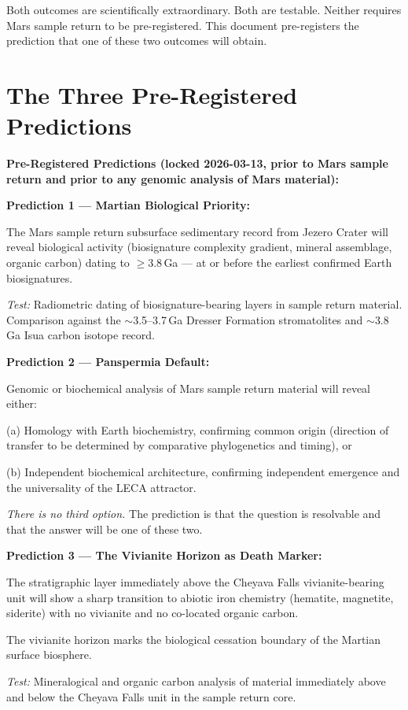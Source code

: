 \documentclass[11pt, a4paper]{article}
\begin{document}
Both outcomes are scientifically
extraordinary.
Both are testable.
Neither requires Mars sample return
to be pre-registered.
This document pre-registers the
prediction that one of these two
outcomes will obtain.

\section{The Three Pre-Registered Predictions}

\begin{mdframed}[
  linecolor=rulecolor,
  linewidth=0.8pt,
  innertopmargin=0.6em,
  innerbottommargin=0.6em,
  innerleftmargin=1em,
  innerrightmargin=1em
]
\textbf{Pre-Registered Predictions
(locked 2026-03-13, prior to Mars
sample return and prior to any
genomic analysis of Mars material):}

\medskip
\textbf{Prediction 1 --- Martian Biological Priority:}

The Mars sample return subsurface
sedimentary record from Jezero Crater
will reveal biological activity
(biosignature complexity gradient,
mineral assemblage, organic carbon)
dating to $\geq$3.8\,Ga ---
at or before the earliest confirmed
Earth biosignatures.

\textit{Test:} Radiometric dating of
biosignature-bearing layers in
sample return material.
Comparison against the $\sim$3.5--3.7\,Ga
Dresser Formation stromatolites and
$\sim$3.8\,Ga Isua carbon isotope record.

\medskip
\textbf{Prediction 2 --- Panspermia Default:}

Genomic or biochemical analysis of Mars
sample return material will reveal either:

(a) Homology with Earth biochemistry,
confirming common origin (direction of
transfer to be determined by comparative
phylogenetics and timing), or

(b) Independent biochemical architecture,
confirming independent emergence and
the universality of the LECA attractor.

\textit{There is no third option.}
The prediction is that the question is
resolvable and that the answer will
be one of these two.

\medskip
\textbf{Prediction 3 --- The Vivianite Horizon
as Death Marker:}

The stratigraphic layer immediately above
the Cheyava Falls vivianite-bearing unit
will show a sharp transition to abiotic
iron chemistry (hematite, magnetite,
siderite) with no vivianite and no
co-located organic carbon.

The vivianite horizon marks the
biological cessation boundary of the
Martian surface biosphere.

\textit{Test:} Mineralogical and organic
carbon analysis of material immediately
above and below the Cheyava Falls unit
in the sample return core.
\end{mdframed}
\end{document}
